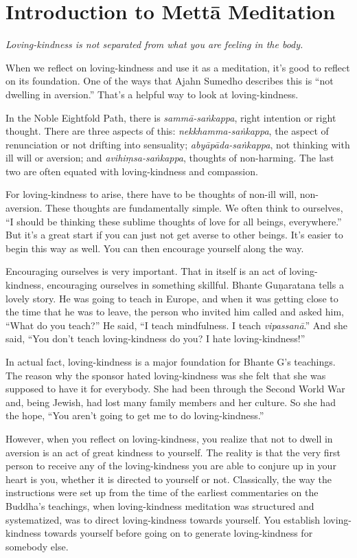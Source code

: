 \chapter{Introduction to Mettā
Meditation}

\epigraph{\emph{Loving-kindness is not separated from what you are
feeling in the body.}}{}

When we reflect on loving-kindness and use it as a meditation, it’s good
to reflect on its foundation. One of the ways that Ajahn Sumedho
describes this is “not dwelling in aversion.” That’s a helpful way to
look at loving-kindness.

In the Noble Eightfold Path, there is \emph{sammā-saṅkappa}, right
intention or right thought. There are three aspects of this:
\emph{nekkhamma-saṅkappa}, the aspect of renunciation or not drifting
into sensuality; \emph{abyāpāda-saṅkappa}, not thinking with ill will or
aversion; and \emph{avihiṃsa-saṅkappa}, thoughts of non-harming. The
last two are often equated with loving-kindness and compassion.

For loving-kindness to arise, there have to be thoughts of non-ill will,
non-aversion. These thoughts are fundamentally simple. We often think to
ourselves, “I should be thinking these sublime thoughts of love for all
beings, everywhere.” But it’s a great start if you can just not get
averse to other beings. It’s easier to begin this way as well. You can
then encourage yourself along the way.

Encouraging ourselves is very important. That in itself is an act of
loving-kindness, encouraging ourselves in something skillful. Bhante
Guṇaratana tells a lovely story. He was going to teach in Europe, and
when it was getting close to the time that he was to leave, the person
who invited him called and asked him, “What do you teach?” He said, “I
teach mindfulness. I teach \emph{vipassanā}.” And she said, “You don’t
teach loving-kindness do you? I hate loving-kindness!”

In actual fact, loving-kindness is a major foundation for Bhante G’s
teachings. The reason why the sponsor hated loving-kindness was she felt
that she was supposed to have it for everybody. She had been through the
Second World War and, being Jewish, had lost many family members and her
culture. So she had the hope, “You aren’t going to get me to do
loving-kindness.”

However, when you reflect on loving-kindness, you realize that not to
dwell in aversion is an act of great kindness to yourself. The reality
is that the very first person to receive any of the loving-kindness you
are able to conjure up in your heart is you, whether it is directed to
yourself or not. Classically, the way the instructions were set up from
the time of the earliest commentaries on the Buddha’s teachings, when
loving-kindness meditation was structured and systematized, was to
direct loving-kindness towards yourself. You establish loving-kindness
towards yourself before going on to generate loving-kindness for
somebody else.

